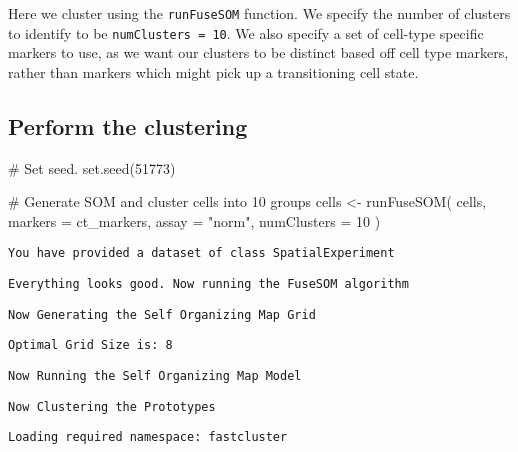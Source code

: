 \documentclass[
  letterpaper,
  DIV=11,
  numbers=noendperiod]{scrreprt}
\newenvironment{Shaded}{\begin{snugshade}}{\end{snugshade}}
\newcommand{\AttributeTok}[1]{\textcolor[rgb]{0.40,0.45,0.13}{#1}}
\newcommand{\CommentTok}[1]{\textcolor[rgb]{0.37,0.37,0.37}{#1}}
\newcommand{\DecValTok}[1]{\textcolor[rgb]{0.68,0.00,0.00}{#1}}
\newcommand{\FunctionTok}[1]{\textcolor[rgb]{0.28,0.35,0.67}{#1}}
\newcommand{\NormalTok}[1]{\textcolor[rgb]{0.00,0.23,0.31}{#1}}
\newcommand{\OtherTok}[1]{\textcolor[rgb]{0.00,0.23,0.31}{#1}}
\newcommand{\StringTok}[1]{\textcolor[rgb]{0.13,0.47,0.30}{#1}}
\begin{document}
Here we cluster using the \texttt{runFuseSOM} function. We specify the
number of clusters to identify to be \texttt{numClusters\ =\ 10}. We
also specify a set of cell-type specific markers to use, as we want our
clusters to be distinct based off cell type markers, rather than markers
which might pick up a transitioning cell state.

\subsection{Perform the clustering}\label{perform-the-clustering}

\begin{Shaded}
\begin{Highlighting}[]
\CommentTok{\# Set seed.}
\FunctionTok{set.seed}\NormalTok{(}\DecValTok{51773}\NormalTok{)}

\CommentTok{\# Generate SOM and cluster cells into 10 groups}
\NormalTok{cells }\OtherTok{\textless{}{-}} \FunctionTok{runFuseSOM}\NormalTok{(}
\NormalTok{  cells,}
  \AttributeTok{markers =}\NormalTok{ ct\_markers,}
  \AttributeTok{assay =} \StringTok{"norm"}\NormalTok{,}
  \AttributeTok{numClusters =} \DecValTok{10}
\NormalTok{)}
\end{Highlighting}
\end{Shaded}

\begin{verbatim}
You have provided a dataset of class SpatialExperiment
\end{verbatim}

\begin{verbatim}
Everything looks good. Now running the FuseSOM algorithm
\end{verbatim}

\begin{verbatim}
Now Generating the Self Organizing Map Grid
\end{verbatim}

\begin{verbatim}
Optimal Grid Size is: 8
\end{verbatim}

\begin{verbatim}
Now Running the Self Organizing Map Model
\end{verbatim}

\begin{verbatim}
Now Clustering the Prototypes
\end{verbatim}

\begin{verbatim}
Loading required namespace: fastcluster
\end{verbatim}
\end{document}

